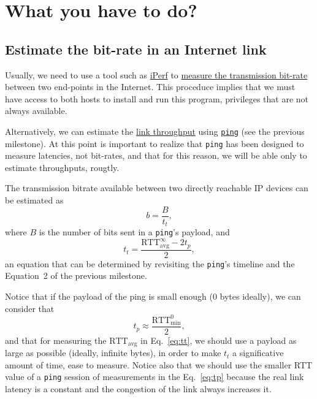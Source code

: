 \section{What you have to do?}

\subsection{Estimate the bit-rate in an Internet link}

Usually, we need to use a tool such as \href{https://iperf.fr/}{iPerf}
to
\href{https://en.wikipedia.org/wiki/Measuring_network_throughput}{measure
  the transmission bit-rate} between two end-points in the
Internet. This proceduce implies that we must have access to both
hosts to install and run this program, privileges that are not always
available.

Alternatively, we can estimate the
\href{https://en.wikipedia.org/wiki/Throughput}{link throughput} using
\href{https://github.com/torvalds/linux/blob/master/net/ipv4/ping.c}{\texttt{ping}}
(see the previous milestone). At this point is important to realize
that \texttt{ping} has been designed to measure latencies, not
bit-rates, and that for this reason, we will be able only to estimate
throughputs, rougtly.

The transmission bitrate available between two directly reachable IP
devices can be estimated as
\begin{equation}
  b=\frac{B}{t_t},
  \label{eq:b}
\end{equation}
where $B$ is the number of bits sent in a \texttt{ping}'s payload, and
\begin{equation}
  t_t = \frac{\text{RTT}_{\text{avg}}^\infty-2t_p}{2},
  \label{eq:tt}
\end{equation}
an equation that can be determined by revisiting the \texttt{ping}'s
timeline and the Equation~2 of the previous milestone.

Notice that if the payload of the ping is small enough ($0$ bytes
ideally), we can consider that
\begin{equation}
  t_p \approx \frac{\text{RTT}_{\text{min}}^0}{2},
  \label{eq:tp}
\end{equation}
and that for measuring the $\text{RTT}_{\text{avg}}$ in
Eq.~\ref{eq:tt}, we should use a payload as large as possible
(ideally, infinite bytes), in order to make $t_t$ a significative
amount of time, ease to measure. Notice also that we should use the
smaller RTT value of a \texttt{ping} session of measurements in the
Eq.~\ref{eq:tp} because the real link latency is a constant and the
congestion of the link always increases it.

